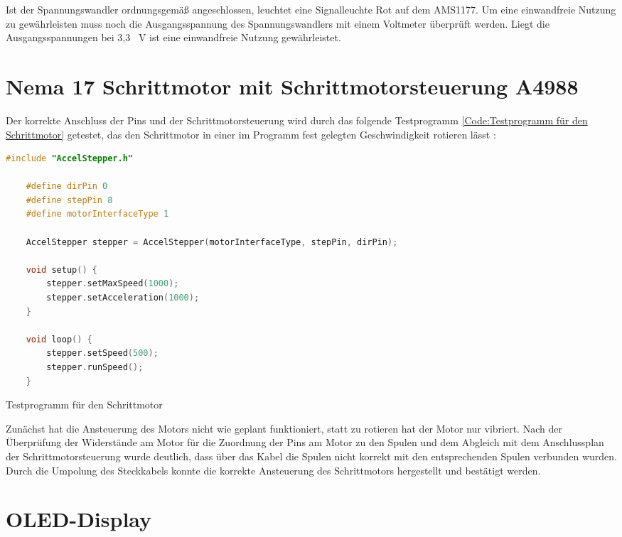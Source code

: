 Ist der Spannungswandler ordnungsgemäß angeschlossen, leuchtet eine Signalleuchte Rot auf dem AMS1177. Um eine einwandfreie Nutzung zu gewährleisten muss noch die Ausgangsspannung des Spannungswandlers mit einem Voltmeter überprüft werden. Liegt die Ausgangsspannungen bei 3,3 \ V ist eine einwandfreie Nutzung gewährleistet. 


\section{ Nema 17 Schrittmotor mit Schrittmotorsteuerung A4988 }

Der korrekte Anschluss der Pins und der Schrittmotorsteuerung wird durch das folgende Testprogramm \ref{Code:Testprogramm für den Schrittmotor} getestet, das den Schrittmotor in einer im Programm fest gelegten Geschwindigkeit rotieren lässt \cite{MikeMcCauley.2024}:

\begin{code}
	\begin{lstlisting}[language=c++]
	#include "AccelStepper.h"
	
	#define dirPin 0
	#define stepPin 8
	#define motorInterfaceType 1
	
	AccelStepper stepper = AccelStepper(motorInterfaceType, stepPin, dirPin);
	
	void setup() {
		stepper.setMaxSpeed(1000);
		stepper.setAcceleration(1000);
	}
	
	void loop() {
		stepper.setSpeed(500);
		stepper.runSpeed();
	}
\end{lstlisting}      

\caption[Testprogramm für den Schrittmotor]{Testprogramm für den Schrittmotor}\label{Code:Testprogramm für den Schrittmotor}    
\end{code} 

Zunächst hat die Ansteuerung des Motors nicht wie geplant funktioniert, statt zu rotieren hat der Motor nur vibriert. Nach der Überprüfung der Widerstände am Motor für die Zuordnung der Pins am Motor zu den Spulen und dem Abgleich mit dem Anschlussplan der Schrittmotorsteuerung wurde deutlich, dass über das Kabel die Spulen nicht korrekt mit den entsprechenden Spulen verbunden wurden. Durch die Umpolung des Steckkabels konnte die korrekte Ansteuerung des Schrittmotors hergestellt und bestätigt werden.

\section{OLED-Display}

